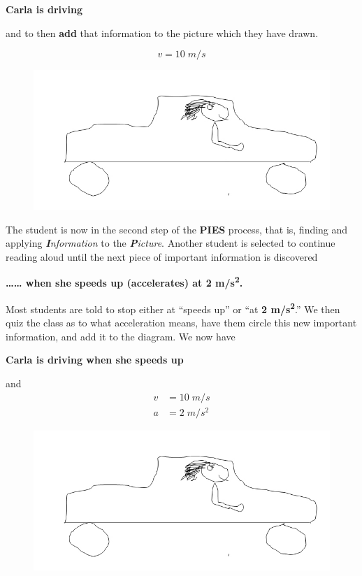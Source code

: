 \documentclass[11.5pt]{sig-alternate} %
\begin{document}
\begin{large}
\textbf{Carla is driving }

and to then \textbf{add} that information to the picture which they have drawn.

\[v = 10\;m/s\]

\begin{figure}[h]
    \centering
    \includegraphics[width=0.95\linewidth]{img1.jpg}
\end{figure}

The student is now in the second step of the \textbf{PIES} process, that is, finding and applying \textit{\textbf{I}nformation} to the \textit{\textbf{P}icture}. Another student is selected to continue reading aloud until the next piece of important information is discovered

\textbf{ …… when she speeds up (accelerates) at 2 m/s\textsuperscript{2}.}

Most students are told to stop either at “speeds up” or “at \textbf{2 m/s\textsuperscript{2}}.”   We then quiz the class as to what acceleration means, have them circle this new important information, and add it to the diagram.  We now have 

\textbf{Carla is driving  when she speeds up }

and 
\begin{align*}
    v &= 10\;m/s \\
    a &= 2\;m/s^{2}
\end{align*}
\begin{figure}[h]
    \centering
    \includegraphics[width=0.95\linewidth]{img1.jpg}
\end{figure}


\end{large}
\end{document}
